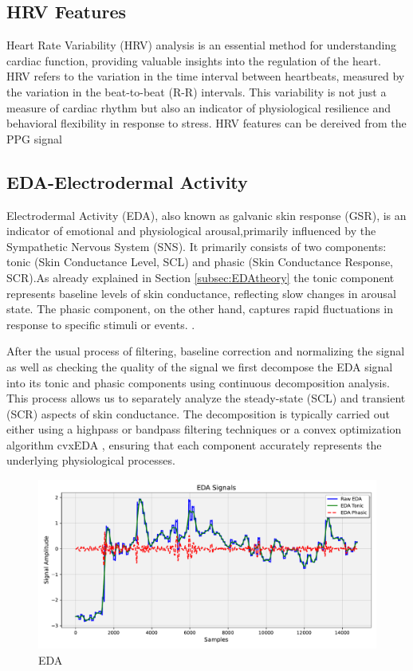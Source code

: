 \subsection*{HRV Features}
Heart Rate Variability (HRV) analysis is an essential method for understanding cardiac function, providing valuable insights into the regulation of the heart. HRV refers to the variation in the time interval between heartbeats, measured by the variation in the beat-to-beat (R-R) intervals. This variability is not just a measure of cardiac rhythm but also an indicator of physiological resilience and behavioral flexibility in response to stress. HRV features can be dereived from the PPG signal

\subsection{EDA-Electrodermal Activity}

Electrodermal Activity (EDA), also known as galvanic skin response (GSR), is an indicator of emotional and physiological arousal,primarily influenced by the Sympathetic Nervous System (SNS). It primarily consists of two components: tonic (Skin Conductance Level, SCL) and phasic (Skin Conductance Response, SCR).As already explained in Section \ref*{subsec:EDAtheory} the tonic component represents baseline levels of skin conductance, reflecting slow changes in arousal state. The phasic component, on the other hand, captures rapid fluctuations in response to specific stimuli or events. \textcite{electrodermal}.

After the usual process of filtering, baseline correction and normalizing the signal as well as checking the quality of the signal we first decompose the EDA signal into its tonic and phasic components using continuous decomposition analysis. This process allows us to separately analyze the steady-state (SCL) and transient (SCR) aspects of skin conductance.
The decomposition is typically carried out either using a highpass or bandpass filtering techniques or a convex optimization algorithm cvxEDA \parencite{cvxEDA} , ensuring that each component accurately represents the underlying physiological processes.
\begin{figure}[hb]
	\centering
	\includegraphics[width=\columnwidth]{images/edaplot.pdf}
	\caption{EDA}
	\label{fig:eda sig}
\end{figure}

